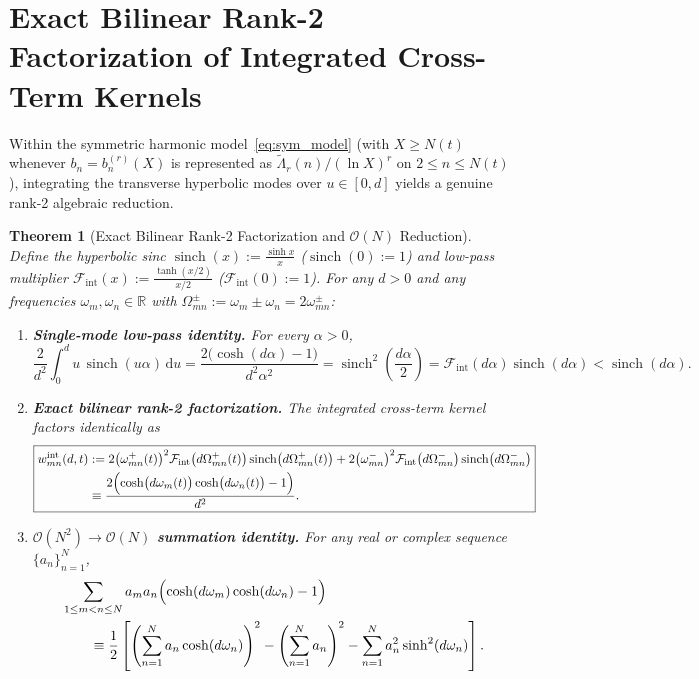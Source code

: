 \documentclass[11pt,reqno]{amsart}
\newtheorem{theorem}{Theorem}[section]
\theoremstyle{definition}
\theoremstyle{remark}
\numberwithin{equation}{section}
\newcommand{\dd}{\,\mathrm{d}}
\newcommand{\R}{\mathbb{R}}
\DeclareMathOperator{\sinch}{sinch}
\begin{document}
\section{Exact Bilinear Rank-2 Factorization of Integrated Cross-Term Kernels}\label{sec:rank2}

Within the symmetric harmonic model~\eqref{eq:sym_model} (with $X \ge N(t)$ whenever $b_n = b_n^{(r)}(X)$ is represented as $\widetilde{\Lambda}_r(n)/(\ln X)^r$ on $2 \le n \le N(t)$), integrating the transverse hyperbolic modes over $u \in [0, d]$ yields a genuine rank-2 algebraic reduction.

\begin{theorem}[Exact Bilinear Rank-2 Factorization and $\mathcal{O}(N)$ Reduction]\label{thm:rank2}
Define the hyperbolic sinc $\sinch(x) := \frac{\sinh x}{x}$ ($\sinch(0) := 1$) and low-pass multiplier $\mathcal{F}_{\mathrm{int}}(x) := \frac{\tanh(x/2)}{x/2}$ ($\mathcal{F}_{\mathrm{int}}(0) := 1$). For any $d > 0$ and any frequencies $\omega_m, \omega_n \in \R$ with $\Omega_{mn}^\pm := \omega_m \pm \omega_n = 2\omega_{mn}^\pm$:
\begin{enumerate}[label=\textup{(\roman*)},leftmargin=2.2em]
\item \textbf{Single-mode low-pass identity.} For every $\alpha > 0$,
\begin{equation}\label{eq:low_pass}
\frac{2}{d^2}\int_{0}^{d} u\,\sinch(u\alpha)\dd u = \frac{2\bigl(\cosh(d\alpha) - 1\bigr)}{d^2\alpha^2} = \sinch^2\!\left(\frac{d\alpha}{2}\right) = \mathcal{F}_{\mathrm{int}}(d\alpha)\sinch(d\alpha) < \sinch(d\alpha).
\end{equation}
\item \textbf{Exact bilinear rank-2 factorization.} The integrated cross-term kernel factors identically as
\begin{equation}\label{eq:boxed_rank2}
\boxed{\begin{aligned}
w_{mn}^{\mathrm{int}}(d,t) &:= 2\bigl(\omega_{mn}^+(t)\bigr)^2\mathcal{F}_{\mathrm{int}}\bigl(d\Omega_{mn}^+(t)\bigr)\sinch\bigl(d\Omega_{mn}^+(t)\bigr) + 2\bigl(\omega_{mn}^-\bigr)^2\mathcal{F}_{\mathrm{int}}\bigl(d\Omega_{mn}^-\bigr)\sinch\bigl(d\Omega_{mn}^-\bigr) \\
&\equiv \frac{2\Bigl(\cosh\bigl(d\omega_m(t)\bigr)\cosh\bigl(d\omega_n(t)\bigr) - 1\Bigr)}{d^2}.
\end{aligned}}
\end{equation}
\item \textbf{$\mathcal{O}(N^2) \to \mathcal{O}(N)$ summation identity.} For any real or complex sequence $\{a_n\}_{n=1}^N$,
\begin{equation}\label{eq:linear_reduction}
\begin{aligned}
&\sum_{1 \le m < n \le N} a_m a_n\Bigl(\cosh(d\omega_m)\cosh(d\omega_n) - 1\Bigr) \\
&\qquad \equiv \frac{1}{2}\left[\left(\sum_{n=1}^{N} a_n\cosh(d\omega_n)\right)^2 - \left(\sum_{n=1}^{N} a_n\right)^2 - \sum_{n=1}^{N} a_n^2\sinh^2(d\omega_n)\right].
\end{aligned}
\end{equation}
\end{enumerate}
\end{theorem}
\end{document}

